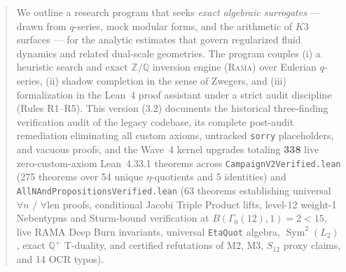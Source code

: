 \begin{center}
\end{center}

\begin{abstract}
\noindent We outline a research program that seeks \emph{exact algebraic
surrogates} --- drawn from $q$-series, mock modular forms, and the arithmetic
of $K3$ surfaces --- for the analytic estimates that govern regularized fluid
dynamics and related dual-scale geometries. The program couples (i) a
heuristic search and exact $\mathbb{Z}/\mathbb{Q}$ inversion engine (\textsc{Rama}) over Eulerian $q$-series, (ii) shadow
completion in the sense of Zwegers, and (iii) formalization in the Lean~4
proof assistant under a strict audit discipline (Rules R1--R5). This version (3.2) documents the historical three-finding verification audit of the legacy codebase, its complete post-audit remediation eliminating all custom axioms, untracked \texttt{sorry} placeholders, and vacuous proofs, and the Wave~4 kernel upgrades totaling \textbf{338} live zero-custom-axiom Lean~4.33.1 theorems across \texttt{CampaignV2Verified.lean} (275 theorems over 54 unique $\eta$-quotients and 5 identities) and \texttt{AllNAndPropositionsVerified.lean} (63 theorems establishing universal $\forall n$ / $\forall\text{len}$ proofs, conditional Jacobi Triple Product lifts, level-12 weight-1 Nebentypus and Sturm-bound verification at $B(\Gamma_0(12),1)=2<15$, live RAMA Deep Burn invariants, universal \texttt{EtaQuot} algebra, $\operatorname{Sym}^2(L_2)$, exact $\mathbb{Q}^+$ T-duality, and certified refutations of M2, M3, $S_{12}$ proxy claims, and 14 OCR typos).
\end{abstract}